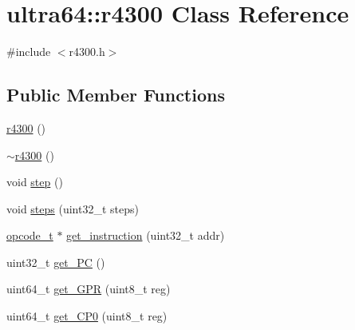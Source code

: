 \hypertarget{classultra64_1_1r4300}{}\section{ultra64\+:\+:r4300 Class Reference}
\label{classultra64_1_1r4300}


{\ttfamily \#include $<$r4300.\+h$>$}

\subsection*{Public Member Functions}
\begin{DoxyCompactItemize}
\item 
\hyperlink{classultra64_1_1r4300_a3237ff90dc6eeaa7110134651af7502c}{r4300} ()
\item 
\hyperlink{classultra64_1_1r4300_a75254779ac5739caaacac21bebe073de}{$\sim$r4300} ()
\item 
void \hyperlink{classultra64_1_1r4300_a708ebf52e731ed7f0bc136827d970a28}{step} ()
\item 
void \hyperlink{classultra64_1_1r4300_a60edf0e7e31eed285519cf4cc276aa40}{steps} (uint32\+\_\+t steps)
\item 
\hyperlink{classultra64_1_1opcode__t}{opcode\+\_\+t} $\ast$ \hyperlink{classultra64_1_1r4300_a910ce489d518f409b99a25b67ee3ef74}{get\+\_\+instruction} (uint32\+\_\+t addr)
\item 
uint32\+\_\+t \hyperlink{classultra64_1_1r4300_a93caed0b87fa0b1211e33afe207f80a3}{get\+\_\+\+PC} ()
\item 
uint64\+\_\+t \hyperlink{classultra64_1_1r4300_a30733608a67eeb571455a0f32936b17c}{get\+\_\+\+G\+PR} (uint8\+\_\+t reg)
\item 
uint64\+\_\+t \hyperlink{classultra64_1_1r4300_a85fc3e736ec2bd92d9397c9860a1f23a}{get\+\_\+\+C\+P0} (uint8\+\_\+t reg)
\end{DoxyCompactItemize}
